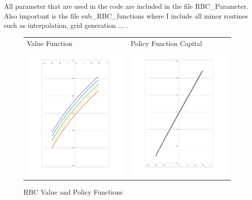 \documentclass[a4paper,12pt]{article}
\begin{document}
All parameter that are used in the code are included in the file RBC\_Parameter. Also important is the file sub\_RBC\_functions where I include all minor routines such as interpolation, grid generation ... .
\newpage




\newpage

\begin{figure}[htb] \centering
\caption{RBC Value and Policy Functions}
\begin{tabular}{C{7.5cm} C{7.5cm}}
Value Function & Policy Function Capital\\
\includegraphics[width=7.5cm]{abbildungen/value_curr} & \includegraphics[width=7.5cm]{abbildungen/capital_curr} \\

\end{tabular}
\end{figure}
\end{document}
